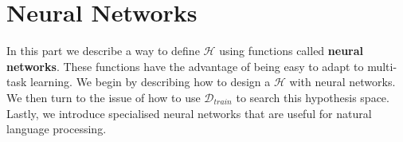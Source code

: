\chapter{Neural Networks}
\label{neural_networks}

In this part we describe a way to define $\mathcal{H}$ using functions called \textbf{neural networks}. These functions have the advantage of being easy to adapt to multi-task learning. We begin by describing how to design a $\mathcal{H}$ with neural networks. We then turn to the issue of how to use $\mathcal{D}_{train}$ to search this hypothesis space. Lastly, we introduce specialised neural networks that are useful for natural language processing.




